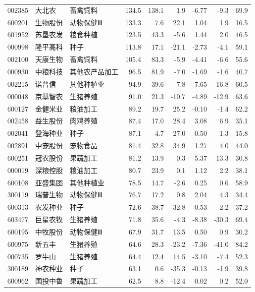 \begin{longtable}{@{}llp{1.9cm}rrrrrr@{}}
002385 & 大北农 & 畜禽饲料 & 134.5 & 138.1 & 1.9 & -6.77 & -9.3 & 69.9 \\
600201 & 生物股份 & 动物保健Ⅲ & 133.3 & 7.6 & 22.1 & 1.04 & 1.9 & 16.5 \\
601952 & 苏垦农发 & 粮食种植 & 123.5 & 43.3 & -5.6 & 1.44 & 2.0 & 46.5 \\
000998 & 隆平高科 & 种子 & 113.8 & 17.1 & -21.1 & -2.73 & -4.1 & 59.1 \\
002100 & 天康生物 & 畜禽饲料 & 105.4 & 83.3 & -5.9 & -4.41 & -6.6 & 55.6 \\
000930 & 中粮科技 & 其他农产品加工 & 96.5 & 81.9 & -7.0 & -1.69 & -1.6 & 40.7 \\
002215 & 诺普信 & 其他种植业 & 94.9 & 39.6 & 7.8 & 7.65 & 16.8 & 60.5 \\
000048 & 京基智农 & 生猪养殖 & 91.0 & 21.3 & -10.7 & -4.89 & -12.9 & 63.6 \\
600127 & 金健米业 & 粮油加工 & 89.2 & 19.7 & 25.2 & -0.10 & -1.4 & 62.2 \\
002458 & 益生股份 & 肉鸡养殖 & 87.4 & 17.0 & 28.4 & 3.08 & 6.9 & 35.1 \\
002041 & 登海种业 & 种子 & 87.1 & 4.7 & 27.0 & 0.50 & 1.3 & 15.8 \\
002891 & 中宠股份 & 宠物食品 & 81.4 & 32.8 & 34.9 & 1.27 & 4.0 & 44.0 \\
600251 & 冠农股份 & 果蔬加工 & 81.2 & 13.9 & 0.3 & 5.37 & 13.3 & 30.8 \\
000019 & 深粮控股 & 粮油加工 & 80.7 & 23.9 & 0.1 & 1.12 & 2.2 & 38.1 \\
600108 & 亚盛集团 & 其他种植业 & 78.5 & 14.7 & -2.6 & 0.25 & 0.6 & 58.9 \\
300119 & 瑞普生物 & 动物保健Ⅲ & 76.7 & 17.2 & 0.8 & 2.04 & 4.3 & 34.4 \\
600313 & 农发种业 & 种子 & 72.6 & 38.7 & 32.8 & 0.53 & 2.2 & 37.2 \\
603477 & 巨星农牧 & 生猪养殖 & 71.8 & 35.6 & -4.3 & -8.38 & -30.3 & 69.4 \\
600195 & 中牧股份 & 动物保健Ⅲ & 67.9 & 31.7 & 13.5 & 0.50 & 0.9 & 30.2 \\
600975 & 新五丰 & 生猪养殖 & 64.6 & 28.3 & -23.2 & -7.36 & -41.0 & 84.2 \\
000735 & 罗牛山 & 生猪养殖 & 64.4 & 12.4 & 14.5 & -3.10 & -7.4 & 52.3 \\
300189 & 神农种业 & 种子 & 63.1 & 0.6 & -35.3 & -0.13 & -1.9 & 39.8 \\
600962 & 国投中鲁 & 果蔬加工 & 62.5 & 8.8 & -12.4 & 0.02 & 0.2 & 52.0 \\

\end{longtable}
